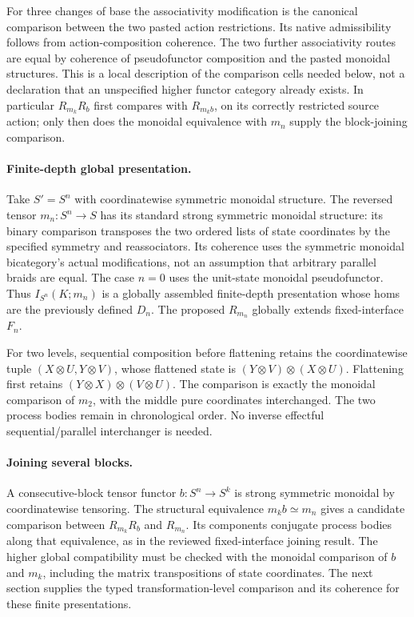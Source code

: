 \documentclass{article}
\begin{document}
For three changes of base the associativity modification is the canonical comparison between the two pasted action restrictions. Its native admissibility follows from action-composition coherence. The two further associativity routes are equal by coherence of pseudofunctor composition and the pasted monoidal structures. This is a local description of the comparison cells needed below, not a declaration that an unspecified higher functor category already exists. In particular $R_{m_k}R_b$ first compares with $R_{m_kb}$, on its correctly restricted source action; only then does the monoidal equivalence with $m_n$ supply the block-joining comparison.

\paragraph{Finite-depth global presentation.} Take $S'=S^n$ with coordinatewise symmetric monoidal structure. The reversed tensor $m_n:S^n\to S$ has its standard strong symmetric monoidal structure: its binary comparison transposes the two ordered lists of state coordinates by the specified symmetry and reassociators. Its coherence uses the symmetric monoidal bicategory's actual modifications, not an assumption that arbitrary parallel braids are equal. The case $n=0$ uses the unit-state monoidal pseudofunctor. Thus $I_{S^n}(K;m_n)$ is a globally assembled finite-depth presentation whose homs are the previously defined $D_n$. The proposed $R_{m_n}$ globally extends fixed-interface $F_n$.

For two levels, sequential composition before flattening retains the coordinatewise tuple $(X\otimes U,Y\otimes V)$, whose flattened state is $(Y\otimes V)\otimes(X\otimes U)$. Flattening first retains $(Y\otimes X)\otimes(V\otimes U)$. The comparison is exactly the monoidal comparison of $m_2$, with the middle pure coordinates interchanged. The two process bodies remain in chronological order. No inverse effectful sequential/parallel interchanger is needed.

\paragraph{Joining several blocks.} A consecutive-block tensor functor $b:S^n\to S^k$ is strong symmetric monoidal by coordinatewise tensoring. The structural equivalence $m_kb\simeq m_n$ gives a candidate comparison between $R_{m_k}R_b$ and $R_{m_n}$. Its components conjugate process bodies along that equivalence, as in the reviewed fixed-interface joining result. The higher global compatibility must be checked with the monoidal comparison of $b$ and $m_k$, including the matrix transpositions of state coordinates. The next section supplies the typed transformation-level comparison and its coherence for these finite presentations.
\end{document}
